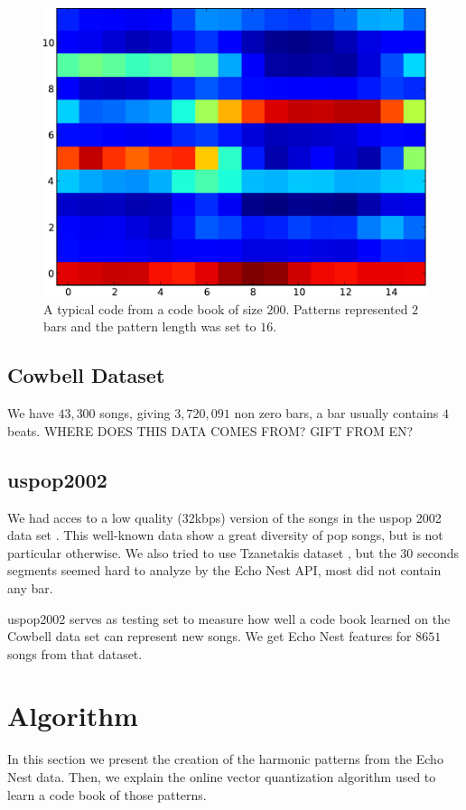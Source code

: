 \documentclass{article}
\begin{document}
\begin{figure}[htb]
\begin{center}
\includegraphics[width=.8\columnwidth]{code}
\end{center}
\caption{{A typical code from a code book of size $200$. Patterns represented
$2$ bars and the pattern length was set to $16$.}}
\label{fig:code}
\end{figure}

\subsection{Cowbell Dataset}
We have $43,300$ songs, giving  $3,720,091$ non zero bars, a bar usually 
contains $4$ beats. WHERE DOES THIS DATA COMES FROM? GIFT FROM EN?


\subsection{uspop2002}
We had acces to a low quality (32kbps) version of the songs in the uspop 2002 
data set \cite{uspop2002}.
This well-known data show a great diversity of pop songs, but is not particular
otherwise. We also tried to use Tzanetakis dataset \cite{Tzanetakis2002a}, but 
the $30$ seconds segments seemed hard to analyze by the Echo Nest API, most did
not contain any bar.

uspop2002 serves as testing set to measure how well a code book learned on
the Cowbell data set can represent new songs. We get Echo Nest features
for $8651$ songs from that dataset.

\section{Algorithm}\label{sec:algo}
In this section we present the creation of the harmonic patterns from
the Echo Nest data. Then, we explain the online vector quantization algorithm
used to learn a code book of those patterns.
\end{document}
